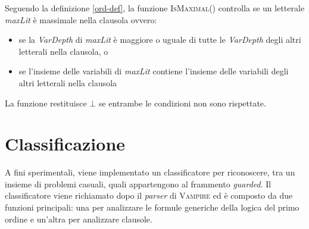 Seguendo la definizione \ref{ord-def}, la funzione \textsc{IsMaximal}() controlla se 
un letterale \emph{maxLit} è massimale nella clausola ovvero:
\begin{itemize}
    \item se la \emph{VarDepth} di \emph{maxLit} è maggiore o uguale di tutte le \emph{VarDepth} degli altri letterali nella clausola, o
    \item se l'insieme delle variabili di \emph{maxLit} contiene l'insieme delle variabili degli altri letterali nella clausola
\end{itemize}
La funzione restituisce $\bot$ se entrambe le condizioni non sono rispettate.
\section{Classificazione}\label{class}
A fini sperimentali, viene implementato un classificatore per riconoscere, tra un insieme di problemi casuali,
quali appartengono al frammento \emph{guarded}.
Il classificatore viene richiamato dopo il \emph{parser} di \textsc{Vampire} 
ed è composto da due funzioni principali: una per analizzare le formule generiche della logica del primo ordine e un'altra per analizzare clausole.


